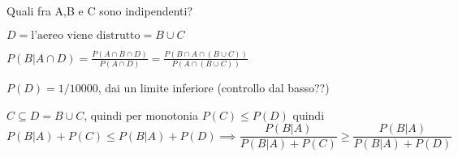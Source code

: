 \documentclass{report}
\begin{document}
Quali fra A,B e C sono indipendenti? 

$ D = \text{l'aereo viene distrutto} = B \cup C $ 

$ P(B|A \cap D) = \frac{P(A \cap B \cap D)}{P(A \cap D)} = \frac{P(B \cap A \cap (B \cup C))}{P(A \cap (B \cup C))} $

$ P(D) = 1/10000 $, dai un limite inferiore (controllo dal basso??) 

$ C \subseteq D = B \cup C $, quindi per monotonia $ P(C) \leq P(D) $ quindi
\[
  P(B|A) + P(C) \leq P(B|A) + P(D) \implies \frac{P(B|A)}{P(B|A)+P(C)} \geq \frac{P(B|A)}{P(B|A) + P(D)}
\]
\end{document}
